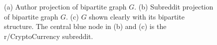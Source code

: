 \documentclass[twoside]{report}
\begin{document}
\begin{spacing}{1}
\begin{figure}[h]
\begin{minipage}{.5\linewidth}
\centering
{}
\end{minipage}%
\begin{minipage}{.5\linewidth}
\centering
{}
\end{minipage}\par\medskip
\centering
{}
\caption{(a) Author projection of bipartite graph $G$. (b) Subreddit projection of bipartite graph $G$. (c) $G$ shown clearly with its bipartite structure. The central blue node in (b) and (c) is the r/CryptoCurrency subreddit.}
\label{fig:bipartite}
\end{figure}


\end{spacing}
\end{document}
